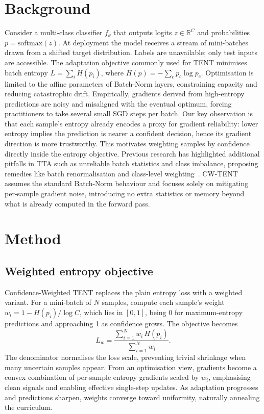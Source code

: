 \documentclass{article} %
\begin{document}
\section{Background}\label{sec:background}%
Consider a multi-class classifier \(f_{\theta}\) that outputs logits \(z \in \mathbb{R}^C\) and probabilities \(p = \mathrm{softmax}(z)\). At deployment the model receives a stream of mini-batches drawn from a shifted target distribution. Labels are unavailable; only test inputs are accessible. The adaptation objective commonly used for TENT minimises batch entropy \(L = \sum_{i} H(p_i)\), where \(H(p) = -\sum_{c} p_c \log p_c\). Optimisation is limited to the affine parameters of Batch-Norm layers, constraining capacity and reducing catastrophic drift.
Empirically, gradients derived from high-entropy predictions are noisy and misaligned with the eventual optimum, forcing practitioners to take several small SGD steps per batch. Our key observation is that each sample's entropy already encodes a proxy for gradient reliability: lower entropy implies the prediction is nearer a confident decision, hence its gradient direction is more trustworthy. This motivates weighting samples by confidence directly inside the entropy objective.
Previous research has highlighted additional pitfalls in TTA such as unreliable batch statistics and class imbalance, proposing remedies like batch renormalisation and class-level weighting~\cite{zhao-2023-delta}. CW-TENT assumes the standard Batch-Norm behaviour and focuses solely on mitigating per-sample gradient noise, introducing no extra statistics or memory beyond what is already computed in the forward pass.

\section{Method}\label{sec:method}%
\subsection{Weighted entropy objective}
Confidence-Weighted TENT replaces the plain entropy loss with a weighted variant. For a mini-batch of \(N\) samples, compute each sample's weight \(w_i = 1 - H(p_i)/\log C\), which lies in \([0,1]\), being 0 for maximum-entropy predictions and approaching 1 as confidence grows. The objective becomes
\[
L_w = \frac{\sum_{i=1}^{N} w_i\, H(p_i)}{\sum_{i=1}^{N} w_i} .
\]
The denominator normalises the loss scale, preventing trivial shrinkage when many uncertain samples appear. From an optimisation view, gradients become a convex combination of per-sample entropy gradients scaled by \(w_i\), emphasising clean signals and enabling effective single-step updates. As adaptation progresses and predictions sharpen, weights converge toward uniformity, naturally annealing the curriculum.
\end{document}
